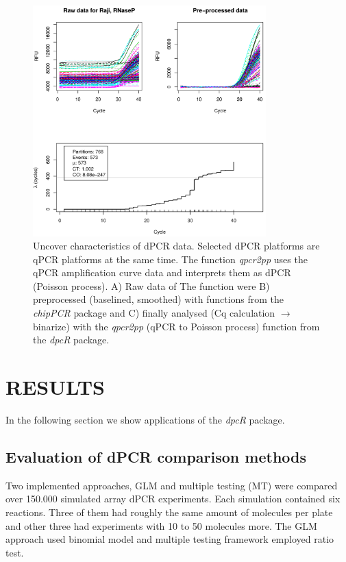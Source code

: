 \documentclass[a4,center,fleqn]{NAR}
\begin{document}
\begin{figure}[t]
\begin{center}
\includegraphics[width=9cm]{qpcr2pp_1.png}
\end{center}
\caption{Uncover characteristics of dPCR data. 
Selected dPCR platforms are qPCR platforms at the same time. The function \textit{qpcr2pp} uses the 
qPCR amplification curve data and interprets them as dPCR (Poisson process). A) Raw data of The 
function were B) preprocessed (baselined, smoothed) with functions from the 
\textit{chipPCR} package and C) finally analysed (Cq calculation $\rightarrow$ binarize) with the 
\textit{qpcr2pp} (qPCR to Poisson process) function from the \textit{dpcR} package.} 
\label{qpcr2pp_1}
\end{figure}

\section{RESULTS}

In the following section we show applications of the \textit{dpcR} package.

\subsection{Evaluation of dPCR comparison methods}

Two implemented approaches, GLM and multiple testing (MT) were compared over 
150.000 simulated array dPCR experiments. Each simulation contained six 
reactions. Three of them had roughly the same amount of molecules per plate and 
other three had experiments with 10 to 50 molecules more. The GLM approach used 
binomial model and multiple testing framework employed ratio test.
\end{document}
